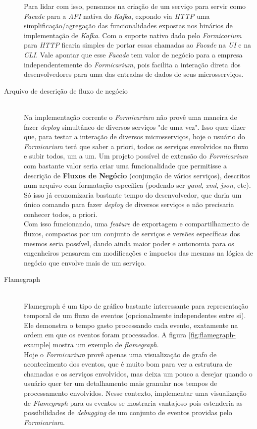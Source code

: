 \begin{description}
  Para lidar com isso, pensamos na criação de um serviço para servir como \textit{Facade} para a \textit{API} nativa do \textit{Kafka}, expondo via \textit{HTTP} uma simplificação/agregação das funcionalidades expostas nos binários de implementação de \textit{Kafka}. Com o suporte nativo dado pelo \textit{Formicarium} para \textit{HTTP} ficaria simples de portar essas chamadas ao \textit{Facade} na \textit{UI} e na \textit{CLI}. Vale apontar que esse \textit{Facade} tem valor de negócio para a empresa independentemente do \textit{Formicarium}, pois facilita a interação direta dos desenvolvedores para uma das entradas de dados de seus microsserviços.
  \item[Arquivo de descrição de fluxo de negócio]
  \hfill \\Na implementação corrente o \textit{Formicarium} não provê uma maneira de fazer \textit{deploy} simultâneo de diversos serviços "de uma vez". Isso quer dizer que, para testar a interação de diversos microsserviços, hoje o usuário do \textit{Formicarium} terá que saber a priori, todos os serviços envolvidos no fluxo e subir todos, um a um. Um projeto possível de extensão do \textit{Formicarium} com bastante valor seria criar uma funcionalidade que permitisse a descrição de \textbf{Fluxos de Negócio} (conjunção de vários serviços), descritos num arquivo com formatação específica (podendo ser \textit{yaml}, \textit{xml}, \textit{json}, etc).
  \\Só isso já economizaria bastante tempo do desenvolvedor, que daria um único comando para fazer \textit{deploy} de diversos serviços e não precisaria conhecer todos, a priori.
  \\Com isso funcionando, uma \textit{feature} de exportagem e compartilhamento de fluxos, compostos por um conjunto de serviços e versões específicas dos mesmos seria possível, dando ainda maior poder e autonomia para os engenheiros pensarem em modificações e impactos das mesmas na lógica de negócio que envolve mais de um serviço. 
  \item[Flamegraph]
  \hfill \\Flamegraph é um tipo de gráfico bastante interessante para representação temporal de um fluxo de eventos (opcionalmente independentes entre si). Ele demonstra o tempo gasto processando cada evento, exatamente na ordem em que os eventos foram processados. A figura \ref{fig:flamegraph-example} mostra um exemplo de \textit{flamegraph}.\\
	Hoje o \textit{Formicarium} provê apenas uma visualização de grafo de acontecimento dos eventos, que é muito bom para ver a estrutura de chamadas e os serviços envolvidos, mas deixa um pouco a desejar quando o usuário quer ter um detalhamento mais granular nos tempos de processamento envolvidos. Nesse contexto, implementar uma visualização de \textit{Flamegraph} para os eventos se mostraria vantajoso pois estenderia as possibilidades de \textit{debugging} de um conjunto de eventos providas pelo \textit{Formicarium}.

\end{description}
